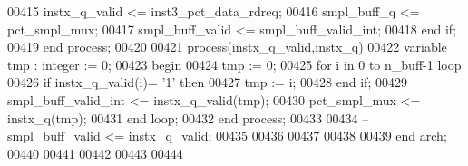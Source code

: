 \begin{DoxyCode}
00415       instx\_q\_valid <= inst3\_pct\_data\_rdreq;
00416       \textcolor{vhdlchar}{smpl_buff_q} \textcolor{vhdlchar}{<=} \textcolor{vhdlchar}{pct_smpl_mux};
00417       \textcolor{vhdlchar}{smpl_buff_valid} \textcolor{vhdlchar}{<=} \textcolor{vhdlchar}{smpl_buff_valid_int};
00418    \textcolor{keywordflow}{end} \textcolor{keywordflow}{if};
00419 \textcolor{keywordflow}{end} \textcolor{keywordflow}{process};
00420 
00421 \textcolor{keywordflow}{process}(instx_q_valid,instx_q)
00422 \textcolor{keywordflow}{variable} \textcolor{vhdlchar}{tmp} \textcolor{vhdlchar}{:} \textcolor{comment}{integer} \textcolor{vhdlchar}{:=} \textcolor{vhdllogic}{}\textcolor{vhdllogic}{0};
00423 \textcolor{vhdlkeyword}{begin}
00424    \textcolor{vhdlchar}{tmp} \textcolor{vhdlchar}{:=} \textcolor{vhdllogic}{}\textcolor{vhdllogic}{0};
00425    \textcolor{keywordflow}{for} \textcolor{vhdlchar}{i} \textcolor{keywordflow}{in} \textcolor{vhdllogic}{}\textcolor{vhdllogic}{0} \textcolor{keywordflow}{to} \textcolor{vhdlchar}{n_buff}\textcolor{vhdlchar}{-}\textcolor{vhdllogic}{}\textcolor{vhdllogic}{1} \textcolor{keywordflow}{loop}
00426       \textcolor{keywordflow}{if} \textcolor{vhdlchar}{instx_q_valid}\textcolor{vhdlchar}{(}\textcolor{vhdlchar}{i}\textcolor{vhdlchar}{)}\textcolor{vhdlchar}{=} \textcolor{vhdlchar}{'}\textcolor{vhdllogic}{}\textcolor{vhdllogic}{1}\textcolor{vhdlchar}{'} \textcolor{keywordflow}{then} 
00427          \textcolor{vhdlchar}{tmp} \textcolor{vhdlchar}{:=} \textcolor{vhdlchar}{i};
00428       \textcolor{keywordflow}{end} \textcolor{keywordflow}{if};
00429       \textcolor{vhdlchar}{smpl_buff_valid_int} \textcolor{vhdlchar}{<=} \textcolor{vhdlchar}{instx_q_valid}\textcolor{vhdlchar}{(}\textcolor{vhdlchar}{tmp}\textcolor{vhdlchar}{)};
00430       \textcolor{vhdlchar}{pct_smpl_mux} \textcolor{vhdlchar}{<=} \textcolor{vhdlchar}{instx_q}\textcolor{vhdlchar}{(}\textcolor{vhdlchar}{tmp}\textcolor{vhdlchar}{)};
00431    \textcolor{keywordflow}{end} \textcolor{keywordflow}{loop};
00432 \textcolor{keywordflow}{end} \textcolor{keywordflow}{process};
00433 
00434 \textcolor{keyword}{-- smpl\_buff\_valid <= instx\_q\_valid;}
00435         
00436 
00437 
00438   
00439 \textcolor{keywordflow}{end} \textcolor{vhdlchar}{arch};   
00440 
00441 
00442 
00443 
00444 
\end{DoxyCode}
